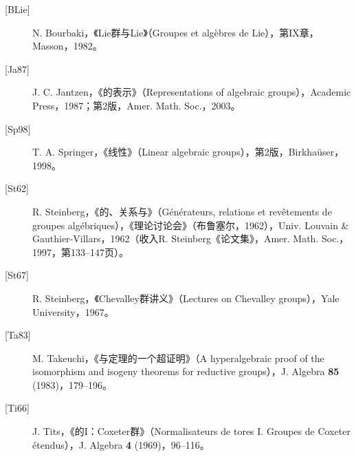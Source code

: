 \begin{description}
\item[{[BLie]}] N. Bourbaki，《Lie群与Lie》（Groupes et algèbres de Lie），第IX章，Masson，1982。
\item[{[Ja87]}] J. C. Jantzen，《的表示》（Representations of algebraic groups），Academic Press，1987；第2版，Amer. Math. Soc.，2003。
\item[{[Sp98]}] T. A. Springer，《线性》（Linear algebraic groups），第2版，Birkhaüser，1998。
\item[{[St62]}] R. Steinberg，《的、关系与》（Générateurs, relations et revêtements de groupes algébriques），《理论讨论会》（布鲁塞尔，1962），Univ. Louvain \& Gauthier-Villars，1962（收入R. Steinberg《论文集》，Amer. Math. Soc.，1997，第133--147页）。
\item[{[St67]}] R. Steinberg，《Chevalley群讲义》（Lectures on Chevalley groups），Yale University，1967。
\item[{[Ta83]}] M. Takeuchi，《与定理的一个超证明》（A hyperalgebraic proof of the isomorphism and isogeny theorems for reductive groups），J. Algebra \textbf{85} (1983)，179--196。
\item[{[Ti66]}] J. Tits，《的I：Coxeter群》（Normalisateurs de tores I. Groupes de Coxeter étendus），J. Algebra \textbf{4} (1969)，96--116。
\end{description}
